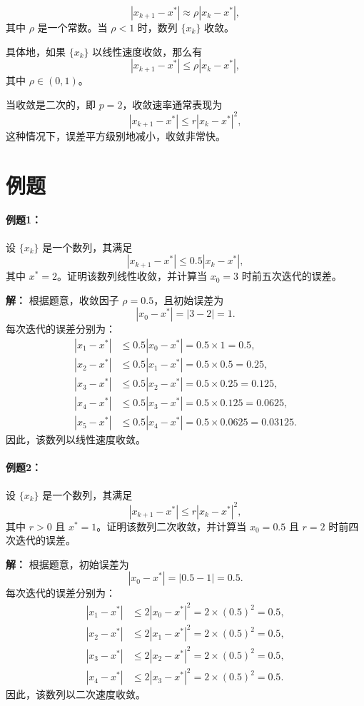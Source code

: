 \[
|x_{k+1} - x^*| \approx \rho |x_k - x^*|,
\]
其中 $\rho$ 是一个常数。当 $\rho < 1$ 时，数列 $\{x_k\}$ 收敛。

具体地，如果 $\{x_k\}$ 以线性速度收敛，那么有
\[
|x_{k+1} - x^*| \leq \rho |x_k - x^*|,
\]
其中 $\rho \in (0, 1)$。

当收敛是二次的，即 $p = 2$，收敛速率通常表现为
\[
|x_{k+1} - x^*| \leq r |x_k - x^*|^2,
\]
这种情况下，误差平方级别地减小，收敛非常快。

\section*{例题}

\paragraph{例题1：}
设 $\{x_k\}$ 是一个数列，其满足
\[
|x_{k+1} - x^*| \leq 0.5 |x_k - x^*|,
\]
其中 $x^* = 2$。证明该数列线性收敛，并计算当 $x_0 = 3$ 时前五次迭代的误差。

\textbf{解：}
根据题意，收敛因子 $\rho = 0.5$，且初始误差为
\[
|x_0 - x^*| = |3 - 2| = 1.
\]
每次迭代的误差分别为：
\[
\begin{aligned}
|x_1 - x^*| &\leq 0.5 |x_0 - x^*| = 0.5 \times 1 = 0.5, \\
|x_2 - x^*| &\leq 0.5 |x_1 - x^*| = 0.5 \times 0.5 = 0.25, \\
|x_3 - x^*| &\leq 0.5 |x_2 - x^*| = 0.5 \times 0.25 = 0.125, \\
|x_4 - x^*| &\leq 0.5 |x_3 - x^*| = 0.5 \times 0.125 = 0.0625, \\
|x_5 - x^*| &\leq 0.5 |x_4 - x^*| = 0.5 \times 0.0625 = 0.03125.
\end{aligned}
\]
因此，该数列以线性速度收敛。

\paragraph{例题2：}
设 $\{x_k\}$ 是一个数列，其满足
\[
|x_{k+1} - x^*| \leq r |x_k - x^*|^2,
\]
其中 $r > 0$ 且 $x^* = 1$。证明该数列二次收敛，并计算当 $x_0 = 0.5$ 且 $r = 2$ 时前四次迭代的误差。

\textbf{解：}
根据题意，初始误差为
\[
|x_0 - x^*| = |0.5 - 1| = 0.5.
\]
每次迭代的误差分别为：
\[
\begin{aligned}
|x_1 - x^*| &\leq 2 |x_0 - x^*|^2 = 2 \times (0.5)^2 = 0.5, \\
|x_2 - x^*| &\leq 2 |x_1 - x^*|^2 = 2 \times (0.5)^2 = 0.5, \\
|x_3 - x^*| &\leq 2 |x_2 - x^*|^2 = 2 \times (0.5)^2 = 0.5, \\
|x_4 - x^*| &\leq 2 |x_3 - x^*|^2 = 2 \times (0.5)^2 = 0.5.
\end{aligned}
\]
因此，该数列以二次速度收敛。

